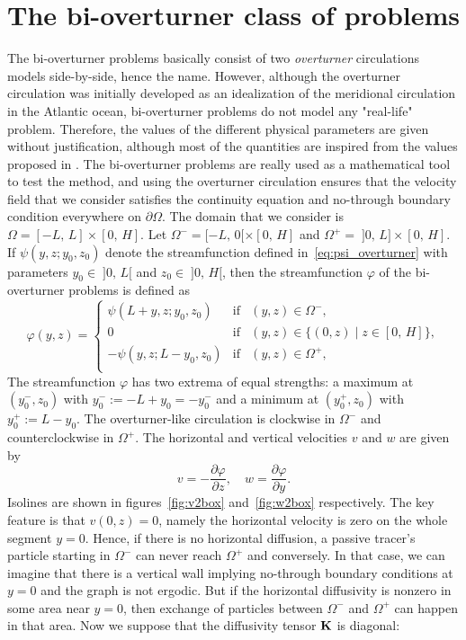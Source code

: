 \section{The bi-overturner class of problems}
The bi-overturner problems basically consist of two \textit{overturner} circulations models side-by-side, hence the name. However, although the overturner circulation was initially developed as an idealization of the meridional circulation in the Atlantic ocean, bi-overturner problems do not model any "real-life" problem. Therefore, the values of the different physical parameters are given without justification, although most of the quantities are inspired from the values proposed in \cite{timmermans2006masterthesis}. The bi-overturner problems are really used as a mathematical tool to test the method, and using the overturner circulation ensures that the velocity field that we consider satisfies the continuity equation and no-through boundary condition everywhere on $\partial \Omega$. The domain that we consider is $\Omega = [-L,\,L]\times[0,\,H]$. Let $\Omega^- = [-L,\,0[\times[0,\,H]$ and $\Omega^+ =\; ]0,\,L]\times[0,\,H]$. If $\psi(y,z;y_0,z_0)$ denote the streamfunction defined in~\eqref{eq:psi_overturner} with parameters $y_0 \in\; ]0,\,L[$ and $z_0 \in\; ]0,\,H[$, then the streamfunction $\varphi$ of the bi-overturner problems is defined as
\begin{equation} \label{eq:psi_2box}
	\varphi(y,z) = \left\{ 
		\begin{array}{lrr}
			\psi(L+y,z;y_0,z_0) & \mbox{if} & (y,z) \in \Omega^-,\\
			0 & \mbox{if} & (y,z) \in \{(0,z)\;|\;z \in [0,\,H]\},\\
			-\psi(y,z;L-y_0,z_0) & \mbox{if} & (y,z) \in \Omega^+,\\
		\end{array}
	\right.
\end{equation}
The streamfunction $\varphi$ has two extrema of equal strengths: a maximum at $(y_0^-,z_0)$ with $y_0^- := -L+y_0 = -y_0^-$ and a minimum at $(y_0^+,z_0)$ with $y_0^+ := L-y_0$. The overturner-like circulation is clockwise in $\Omega^-$ and counterclockwise in $\Omega^+$. The horizontal and vertical velocities $v$ and $w$ are given by
\begin{equation} \label{eq:u-psi_2box}
	v = -\frac{\partial \varphi}{\partial z}, \quad w = \frac{\partial  \varphi}{\partial y}.
\end{equation}
 Isolines are shown in figures~\ref{fig:v2box} and~\ref{fig:w2box} respectively. The key feature is that $v(0,z) = 0$, namely the horizontal velocity is zero on the whole segment $y = 0$. Hence, if there is no horizontal diffusion, a passive tracer's particle starting in $\Omega^-$ can never reach $\Omega^+$ and conversely. In that case, we can imagine that there is a vertical wall implying no-through boundary conditions at $y=0$ and the graph is not ergodic. But if the horizontal diffusivity is nonzero in some area near $y=0$, then exchange of particles between $\Omega^-$ and $\Omega^+$ can happen in that area. Now we suppose that the diffusivity tensor $\mathbf K$ is diagonal:
